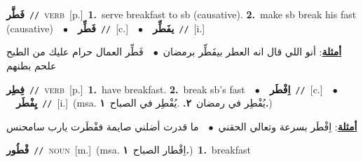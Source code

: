 \documentclass[10pt,a4paper,twoside]{article} %
\begin{document}
\begin{multicols}{2}
{\setlength\topsep{0pt}\textbf{\foreignlanguage{arabic}{فَطَّر}}\ {\color{gray}\texttt{//}\color{black}}\ \textsc{verb}\ [p.]\ \textbf{1.}~serve breakfast to sb (causative).  \textbf{2.}~make sb break his fast (causative)\ \ $\bullet$\ \ \setlength\topsep{0pt}\textbf{\foreignlanguage{arabic}{فَطِّر}}\ {\color{gray}\texttt{//}\color{black}}\ [c.]\ \ $\bullet$\ \ \setlength\topsep{0pt}\textbf{\foreignlanguage{arabic}{يفَطِّر}}\ {\color{gray}\texttt{//}\color{black}}\ [i.]\  \begin{flushright}\color{gray}\foreignlanguage{arabic}{\textbf{\underline{\foreignlanguage{arabic}{أمثلة}}}: أنو اللي قال انه العطر بيفَطِّر برمضان\ $\bullet$\ \  فَطِّر العمال حرام عليك من الطبح علحم بطنهم}\end{flushright}\color{black}} \vspace{2mm}

{\setlength\topsep{0pt}\textbf{\foreignlanguage{arabic}{فِطِر}}\ {\color{gray}\texttt{//}\color{black}}\ \textsc{verb}\ [p.]\ \textbf{1.}~have breakfast.  \textbf{2.}~break sb's fast\ \ $\bullet$\ \ \setlength\topsep{0pt}\textbf{\foreignlanguage{arabic}{اِفْطَر}}\ {\color{gray}\texttt{//}\color{black}}\ [c.]\ \ $\bullet$\ \ \setlength\topsep{0pt}\textbf{\foreignlanguage{arabic}{يِفْطَر}}\ {\color{gray}\texttt{//}\color{black}}\ [i.]\ \color{gray}(msa. \foreignlanguage{arabic}{يُفْطِر في رمضان}~\foreignlanguage{arabic}{\textbf{٢.}}  .\foreignlanguage{arabic}{يُفْطِر في الصباح}~\foreignlanguage{arabic}{\textbf{١.}})\color{black}\  \begin{flushright}\color{gray}\foreignlanguage{arabic}{\textbf{\underline{\foreignlanguage{arabic}{أمثلة}}}: اِفْطَر بسرعة وتعالي الحقني\ $\bullet$\ \  ما قدرت أضلني صايمة ففْطَرت يارب سامحنس}\end{flushright}\color{black}} \vspace{2mm}

{\setlength\topsep{0pt}\textbf{\foreignlanguage{arabic}{فْطُور}}\ {\color{gray}\texttt{//}\color{black}}\ \textsc{noun}\ [m.]\ \color{gray}(msa. \foreignlanguage{arabic}{اِفْطار الصباح}~\foreignlanguage{arabic}{\textbf{١.}})\color{black}\ \textbf{1.}~breakfast\ } \vspace{2mm}


\end{multicols}
\end{document}
